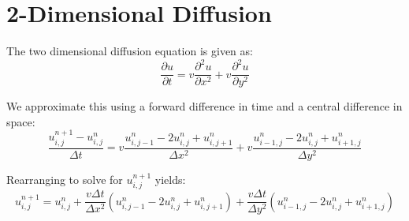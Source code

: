 \section{2-Dimensional Diffusion}


The two dimensional diffusion equation is given as:
\begin{equation}
  \frac{\partial u}{\partial t} = v\frac{\partial^2 u}{\partial x^2} + v\frac{\partial^2 u}{\partial y^2}  
\end{equation}

We approximate this using a forward difference in time and a central difference in space:
\begin{equation}
  \frac{u^{n+1}_{i, j} - u^{n}_{i, j}}{\Delta t} = v\frac{ u^{n}_{i, j-1} - 2  u^{n}_{i, j} +  u^{n}_{i, j+1}}{\Delta x^2} + v\frac{ u^{n}_{i-1, j} - 2  u^{n}_{i, j} +  u^{n}_{i+1, j}}{\Delta y^2}
\end{equation}

Rearranging to solve for $u^{n+1}_{i, j}$ yields:
\begin{equation}
u^{n+1}_{i, j} = u^{n}_{i, j} + \frac{v\Delta t}{\Delta x^2}(u^{n}_{i, j-1} - 2  u^{n}_{i, j} +  u^{n}_{i, j+1}) + \frac{v\Delta t}{\Delta y^2}(u^{n}_{i-1, j} - 2  u^{n}_{i, j} +  u^{n}_{i+1, j})
\end{equation}
